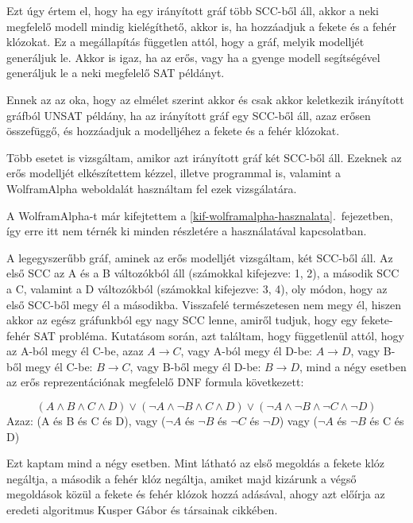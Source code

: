 \documentclass[
]{thesis-ekf}
\theoremstyle{definition}
\theoremstyle{remark}
\begin{document}
	Ezt úgy értem el, hogy ha egy irányított gráf több \textsc{SCC}-ből áll, akkor a neki megfelelő modell mindig kielégíthető, akkor is, ha hozzáadjuk a fekete és a fehér klózokat. Ez a megállapítás független attól, hogy a gráf, melyik modelljét generáljuk le. Akkor is igaz, ha az erős, vagy ha a gyenge modell segítségével generáljuk le a neki megfelelő \textsc{SAT} példányt.
	
	Ennek az az oka, hogy az elmélet szerint akkor és csak akkor keletkezik irányított gráfból UNSAT példány, ha az irányított gráf egy \textsc{SCC}-ből áll, azaz erősen összefüggő, és hozzáadjuk a modelljéhez a fekete és a fehér klózokat.
	
	Több esetet is vizsgáltam, amikor azt irányított gráf két \textsc{SCC}-ből áll. Ezeknek az erős modelljét elkészítettem kézzel, illetve programmal is, valamint a WolframAlpha weboldalát használtam fel ezek vizsgálatára.
	
	A WolframAlpha-t már kifejtettem a \ref{kif-wolframalpha-hasznalata}.~fejezetben, így erre itt nem térnék ki minden részletére a használatával kapcsolatban.
	 
	A legegyszerűbb gráf, aminek az erős modelljét vizsgáltam, két \textsc{SCC}-ből áll. Az első \textsc{SCC} az A és a B változókból áll (számokkal kifejezve: 1, 2), a második \textsc{SCC} a C, valamint a D változókból (számokkal kifejezve: 3, 4), oly módon, hogy az első \textsc{SCC}-ből megy él a másodikba. Visszafelé természetesen nem megy él, hiszen akkor az egész gráfunkból egy nagy \textsc{SCC} lenne, amiről tudjuk, hogy egy fekete-fehér \textsc{SAT} probléma. Kutatásom során, azt találtam, hogy függetlenül attól, hogy az A-ból megy él C-be, azaz $ A \rightarrow C $, vagy A-ból megy él D-be: $A \rightarrow D$, vagy B-ből megy él C-be: $B\rightarrow C$, vagy B-ből megy él D-be: $B\rightarrow D$, mind a négy esetben az erős reprezentációnak megfelelő \textsc{DNF} formula következett:
	
	\[ (A\wedge B\wedge C\wedge D)\vee (\neg A\wedge\neg B\wedge C\wedge D)\vee (\neg A\wedge\neg B\wedge\neg C\wedge\neg D) \]
	Azaz: (A és B és C és D), vagy ($ \neg A $ és $ \neg B $ és $ \neg C $ és $ \neg D $) vagy ($ \neg A $ és $ \neg B $ és C és D)
	
	Ezt kaptam mind a négy esetben. Mint látható az első megoldás a fekete klóz negáltja, a második a fehér klóz negáltja, amiket majd kizárunk a végső megoldások közül a fekete és fehér klózok hozzá adásával, ahogy azt előírja az eredeti algoritmus Kusper Gábor és társainak cikkében\cite{am}.
	
\end{document}
